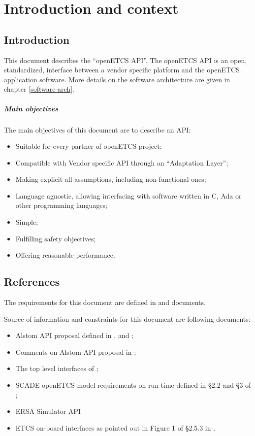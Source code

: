 \chapter{Introduction and context}

\section{Introduction}

This document describes the ``openETCS API''. The openETCS API is an
open, standardized, interface between a vendor specific platform and
the openETCS application software. More details on the software
architecture are given in chapter \ref{software-arch}.

\paragraph{Main objectives} The main objectives of this document are
to describe an API:
\begin{itemize}
\item Suitable for every partner of openETCS project;
\item Compatible with Vendor specific API through an ``Adaptation Layer'';
\item Making explicit all assumptions, including non-functional ones;
\item Language agnostic, allowing interfacing with software written
  in C, Ada or other programming languages;
\item Simple;
\item Fulfilling safety objectives;
\item Offering reasonable performance.
\end{itemize}


\section{References}

The requirements for this document are defined in \cite[§7.1]{D2.6-9} and
\cite{API-req-2} documents.

Source of information and constraints for this document are following
documents:
\begin{itemize}
\item Alstom API proposal defined in \cite{alstom-api},
  \cite{alstom-api-app-layer} and \cite{alstom-api-data-dict};
\item Comments on Alstom API proposal in \cite{alstom-api-comments};
\item The top level interfaces of \cite{sysml-model};
\item SCADE openETCS model requirements on run-time defined in §2.2
  and §3 of \cite{scade-modelling-guide};
\item ERSA Simulator API  %
\item ETCS on-board interfaces as pointed out in Figure 1 of §2.5.3 in
  \cite{subset-026}.
\end{itemize}



